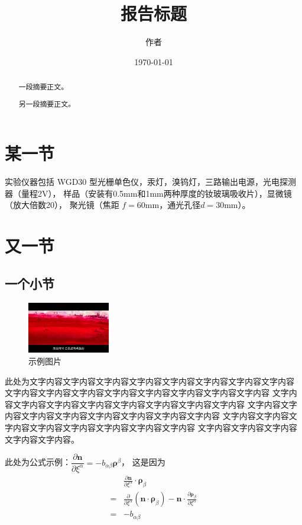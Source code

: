 \documentclass[]{templateWYC}
\title{报告标题}
\author{作者}
\affil{下北泽大学$\quad$2020114514}
\date{\today}
\begin{document}
	\maketitle

	\begin{abstract}
		一段摘要正文。

		另一段摘要正文。
	\end{abstract}

	\section{某一节}\label{sec:1}
		实验仪器包括 WGD30 型光栅单色仪，汞灯，溴钨灯，三路输出电源，光电探测器（量程2\si{\volt}），
		样品（安装有0.5\si{\milli\metre}和1\si{\milli\metre}两种厚度的钕玻璃吸收片），显微镜（放大倍数20），
		聚光镜（焦距 $f = 60\si{\milli\metre}$，通光孔径$d = 30\si{\milli\metre}$）。

	\section{又一节}
	\subsection{一个小节}
		\begin{figure}
			\centering
			\includegraphics[width=0.32\textwidth]{sample.jpg}
			\caption{示例图片}\label{fig:1}
		\end{figure}

		此处为文字内容文字内容文字内容文字内容文字内容文字内容文字内容文字内容
		文字内容文字内容文字内容文字内容文字内容文字内容文字内容文字内容
		文字内容文字内容文字内容文字内容文字内容文字内容文字内容文字内容
		文字内容文字内容文字内容文字内容文字内容文字内容文字内容文字内容
		文字内容文字内容文字内容文字内容文字内容文字内容文字内容文字内容
		文字内容文字内容文字内容文字内容文字内容。

		此处为公式示例：$\dfrac{\partial \bm{n}}{\partial \xi^\alpha}=-b_{\alpha\beta}\bm{\rho}^\beta$，
		这是因为
		\begin{align*}
			&\frac{\partial \bm{n}}{\partial \xi^\alpha}\cdot\bm{\rho}_\beta\\
			=&\frac{\partial}{\partial \xi^\alpha}(\bm{n}\cdot\bm{\rho}_\beta) - \bm{n}\cdot\frac{\partial \bm{\rho}_\beta}{\partial \xi^\alpha}\\
			=&-b_{\alpha\beta}
		\end{align*}
		
\end{document}
